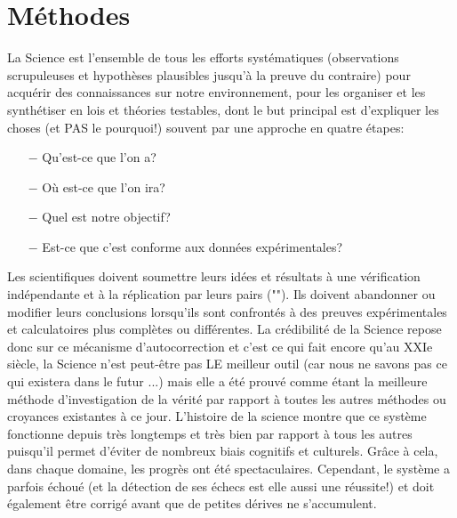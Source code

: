 	\section{Méthodes}	
	La Science est l'ensemble de tous les efforts systématiques (observations scrupuleuses et hypothèses plausibles jusqu'à la preuve du contraire) pour acquérir des connaissances sur notre environnement, pour les organiser et les synthétiser en lois et théories testables, dont le but principal est d'expliquer les choses (et PAS le pourquoi!) souvent par une approche en quatre étapes:
	\begin{itemize}
		\item[$-$] Qu'est-ce que l'on a?
		\item[$-$] Où est-ce que l'on ira?
		\item[$-$] Quel est notre objectif?	
		\item[$-$] Est-ce que c'est conforme aux données expérimentales?
	\end{itemize}
	Les scientifiques doivent soumettre leurs idées et résultats à une vérification indépendante et à la réplication par leurs pairs (""). Ils doivent abandonner ou modifier leurs conclusions lorsqu'ils sont confrontés à des preuves expérimentales et calculatoires plus complètes ou différentes. La crédibilité de la Science repose donc sur ce mécanisme d'autocorrection et c'est ce qui fait encore qu'au XXIe siècle, la Science n'est peut-être pas LE meilleur outil (car nous ne savons pas ce qui existera dans le futur ...) mais elle a été prouvé comme étant la meilleure méthode d'investigation de la vérité par rapport à toutes les autres méthodes ou croyances existantes à ce jour. L'histoire de la science montre que ce système fonctionne depuis très longtemps et très bien par rapport à tous les autres puisqu'il permet d'éviter de nombreux biais cognitifs et culturels. Grâce à cela, dans chaque domaine, les progrès ont été spectaculaires. Cependant, le système a parfois échoué (et la détection de ses échecs est elle aussi une réussite!) et doit également être corrigé avant que de petites dérives ne s'accumulent.

